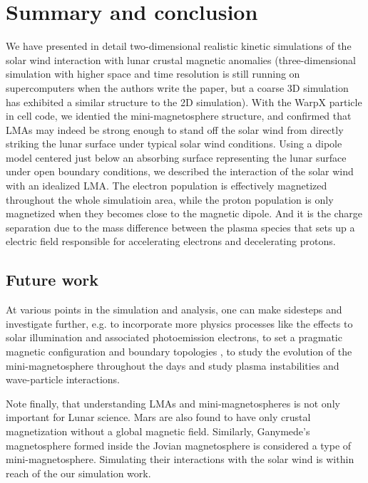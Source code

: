 
\chapter{Summary and conclusion}

We have presented in detail two-dimensional realistic kinetic simulations of the solar wind interaction with lunar crustal magnetic anomalies (three-dimensional simulation with higher space and time resolution is still running on supercomputers when the authors write the paper, but a coarse 3D simulation has exhibited a similar structure to the 2D simulation). With the WarpX particle in cell code, we identied the mini-magnetosphere structure, and confirmed that LMAs may indeed be strong enough to stand off the solar wind from directly striking the lunar surface under typical solar wind conditions. Using a dipole model centered just below an absorbing surface representing the lunar surface under open boundary conditions, we described the interaction of the solar wind with an idealized LMA. The electron population is effectively magnetized throughout the whole simulatioin area, while the proton population is only magnetized when they becomes close to the magnetic dipole. And it is the charge separation due to the mass difference between the plasma species that sets up a electric field responsible for accelerating electrons and decelerating protons.

\section{Future work}

At various points in the simulation and analysis, one can make sidesteps and investigate further, e.g. to incorporate more physics processes like the effects to solar illumination and associated photoemission electrons, to set a pragmatic magnetic configuration and boundary topologies \citep{zimmermanKineticSimulationsKilometerscale2015}, to study the evolution of the mini-magnetosphere throughout the days and study plasma instabilities and wave-particle interactions. 

Note finally, that understanding LMAs and mini-magnetospheres is not only important for Lunar science. Mars are also found to have only crustal magnetization without a global magnetic field. Similarly, Ganymede’s magnetosphere formed inside the Jovian magnetosphere is considered a type of mini-magnetosphere. Simulating their interactions with the solar wind is within reach of the our simulation work.